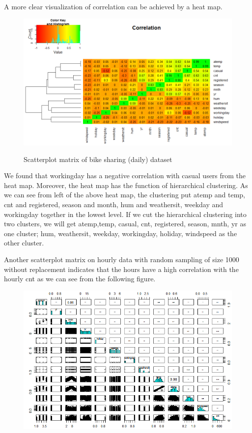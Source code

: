 \documentclass[12pt]{article}
\begin{document}
	A more clear visualization of correlation can be achieved by a heat map. 
	\begin{figure}[H]
		\includegraphics[scale=0.6]{figures/correlation.png}
		\label{fig:correlation}
		\caption{Scatterplot matrix of bike sharing (daily) dataset}
	\end{figure}
	We found that workingday has a negative correlation with casual users from the heat map. 
	Moreover, the heat map has the function of hierarchical clustering. As we can see from left of the above heat map, the clustering put atemp and temp, cnt and registered, season and month, hum and weathersit, weekday and workingday together in the lowest level.  If we cut the hierarchical clustering into two clusters, we will get atemp,temp, casual, cnt, registered, season, mnth, yr as one cluster; hum, weathersit, weekday, workingday, holiday, windspeed as the other cluster.
	
	Another scatterplot matrix on hourly data with random sampling of size 1000 without replacement indicates that the hours have a high correlation with the hourly cnt as we can see from the following figure. 
	\begin{figure}[H]
		\includegraphics[scale=0.7]{figures/scatterplot_col_season.png}
	\end{figure}
	
\end{document}
